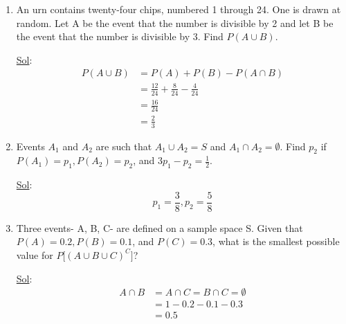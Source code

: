 \begin{enumerate}
  \item[10.] An urn contains twenty-four chips, numbered 1 through
    24. One is drawn at random. Let A be the event that the number is
    divisible by 2 and let B be the event that the number is
    divisible by 3. Find \(P(A \cup B)\).

    \underline{Sol}:
    \[
      \begin{aligned}
        P(A \cup B) &= P(A) + P(B) - P(A \cap B) \\
        &= \frac{12}{24} + \frac{8}{24} - \frac{4}{24} \\
        &= \frac{16}{24} \\
        &= \boxed{\frac{2}{3}}
      \end{aligned}
    \]

  \item[12.] Events \(A_1\) and \(A_2\) are such that \(A_1 \cup A_2
    = S\) and \(A_1 \cap A_2 = \emptyset\). Find \(p_2\) if \(P(A_1)
    = p_1, P(A_2) = p_2\), and \(3p_1 - p_2 = \frac{1}{2}\).

    \underline{Sol}:
    \[
      \boxed{p_1 = \frac{3}{8}, p_2 = \frac{5}{8}}
    \]

  \item[14.] Three events- A, B, C- are defined on a sample space S.
    Given that \(P(A) = 0.2, P(B) = 0.1 \), and \(P(C) = 0.3\), what
    is the smallest possible value for \(P \lbrack (A \cup B \cup
    C)^C \rbrack \)?

    \underline{Sol}:
    \[
      \begin{aligned}
        A \cap B &= A \cap C = B \cap C = \emptyset \\
        &= 1 - 0.2 - 0.1 - 0.3 \\
        &= \boxed{0.5}
      \end{aligned}
    \]
\end{enumerate}
